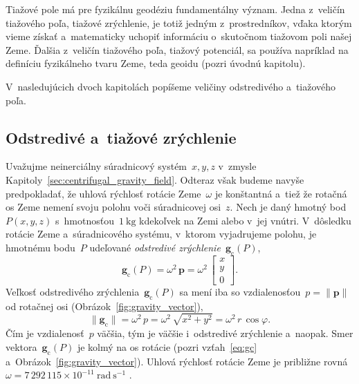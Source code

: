 \documentclass[a4paper, 12pt]{book}
\newcommand{\cidx}{\mathrm c}
\let\vec\mathbf
\begin{document}
Tiažové pole má pre fyzikálnu geodéziu fundamentálny význam.  Jedna z~veličín 
tiažového poľa, tiažové zrýchlenie, je totiž jedným z~prostredníkov, vďaka 
ktorým vieme získať a~matematicky uchopiť informáciu o~skutočnom tiažovom poli 
našej Zeme.  Ďalšia z~veličín tiažového poľa, tiažový potenciál, sa používa 
napríklad na definíciu fyzikálneho tvaru Zeme, teda geoidu (pozri úvodnú 
kapitolu).

V~nasledujúcich dvoch kapitolách popíšeme veličiny odstredivého a~tiažového 
poľa.






\subsection{Odstredivé a~tiažové zrýchlenie}
\label{sec:centrifugal_and_gravity_acceleration}

Uvažujme neinerciálny súradnicový systém~$x, y, z$ v~zmysle 
Kapitoly~\ref{sec:centrifugal_gravity_field}.  Odteraz však budeme navyše 
predpokladať, že uhlová rýchlosť rotácie Zeme~$\omega$ je konštantná a~tiež že 
rotačná os Zeme nemení svoju polohu voči súradnicovej osi~$z$.  Nech je daný 
hmotný bod~$P(x, y, z)$ s~hmotnosťou~$1\ \mathrm{kg}$ kdekoľvek na Zemi alebo 
v~jej vnútri.  V~dôsledku rotácie Zeme a~súradnicového systému, v~ktorom 
vyjadrujeme polohu, je hmotnému bodu~$P$ udeľované \emph{odstredivé 
zrýchlenie}~$\vec g_\cidx(P)$,
%
\begin{equation}
\label{eq:gc}
\vec g_\cidx(P) = \omega^2 \, \vec p =
%
\omega^2 \, \begin{bmatrix}
x\\
y\\
0
\end{bmatrix}
%
{.}
\end{equation}
%
Veľkosť odstredivého zrýchlenia~$\vec g_\cidx(P)$ sa mení iba so 
vzdialenosťou~$p = \| \vec p \|$ od rotačnej osi 
(Obrázok~\ref{fig:gravity_vector}),
%
\begin{equation}
\label{eq:gc_magnitude}
\| \vec g_\cidx \| = \omega^2 \, p = \omega^2 \, \sqrt{x^2 + y^2} = \omega^2 \, 
r \, \cos\varphi{.}
\end{equation}
%
Čím je vzdialenosť~$p$ väčšia, tým je väčšie i~odstredivé zrýchlenie a~naopak.
Smer vektora~$\vec g_\cidx(P)$ je kolmý na os
rotácie (pozri vzťah~\ref{eq:gc} a~Obrázok~\ref{fig:gravity_vector}).  Uhlová 
rýchlosť rotácie Zeme je približne
rovná~$\omega = 7\, 292\, 115 \times 10^{-11} \ \mathrm{rad} \ \mathrm{s}^{-1}$ 
\parencite{GRS80}{.}
\end{document}
